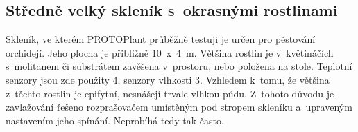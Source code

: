 
\begin{table}[h]
    \centering
    \caption{Tabulka s~cenovou kalkulací systému pro menší skleník.}
    \label{tab:SmallGreenhousePricing}
\end{table}

\subsection{Středně velký skleník s~okrasnými rostlinami}
Skleník, ve kterém PROTOPlant průběžně testuji je určen pro pěstování orchidejí. 
Jeho plocha je přibližně 10~x~4~m.
Většina rostlin je v~květináčích s~molitanem či substrátem zavěšena v~prostoru, nebo položena na stole.
Teplotní senzory jsou zde použity 4, senzory vlhkosti 3.
Vzhledem k~tomu, že většina z~těchto rostlin je epifytní, nesnášejí trvale vlhkou půdu. 
Z~tohoto důvodu je zavlažování řešeno rozprašovačem umístěným pod stropem skleníku a~upraveným nastavením jeho spínání.
Neprobíhá tedy tak často.

